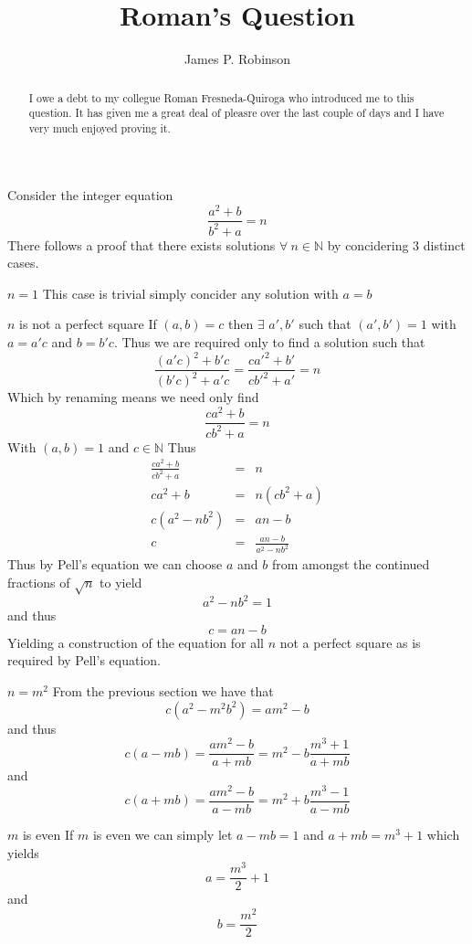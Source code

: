 \documentclass[a4paper,12pt]{article}
\title{Roman's Question}
\author{James P. Robinson}
\begin{document}
\maketitle
\begin{abstract}
\noindent
I owe a debt to my collegue Roman Fresneda-Quiroga who introduced me to this question. It has given me a great deal of pleasre over the last couple of days and I have very much enjoyed proving it.
\end{abstract}
Consider the integer equation $$\frac{a^2+b}{b^2+a}=n$$
There follows a proof that there exists solutions $\forall\ n\in\mathbb{N}$ by concidering 3 distinct cases.
\begin{section}{$n = 1$}
This case is trivial simply concider any solution with $a = b$
\end{section}
\begin{section}{$n$ is not a perfect square}
If $(a,b)=c$ then $\exists$ $a',b'$ such that $(a',b')=1$ with $a=a'c$ and $b=b'c$. Thus we are required only to find a solution such that $$\frac{(a'c)^2 + b'c}{(b'c)^2+a'c} = \frac{ca'^2+b'}{cb'^2+a'} = n$$ 
Which by renaming means we need only find  $$\frac{ca^2+b}{cb^2+a}=n$$ With $(a,b) = 1$ and $c\in\mathbb{N}$
Thus 
\begin{eqnarray*}
  \frac{ca^2+b}{cb^2+a}&=&n\\
  ca^2+b&=&n(cb^2+a)\\
  c(a^2-nb^2)&=&an-b\\
  c&=&\frac{an-b}{a^2-nb^2}
\end{eqnarray*}
Thus by Pell's equation we can choose $a$ and $b$ from amongst the continued fractions of $\sqrt{n}$ to yield $$a^2-nb^2=1$$ and thus $$c=an-b$$ Yielding a construction of the equation for all $n$ not a perfect square as is required by Pell's equation.
\end{section}
\begin{section}{$n=m^2$}
From the previous section we have that $$c(a^2-m^2b^2)=am^2-b$$
and thus $$c(a-mb)=\frac{am^2-b}{a+mb}=m^2-b\frac{m^3+1}{a+mb}$$
and $$c(a+mb)=\frac{am^2-b}{a-mb}=m^2+b\frac{m^3-1}{a-mb}$$
\begin{subsection}{$m$ is even}
  If $m$ is even we can simply let $a-mb=1$ and $a+mb=m^3+1$ which yields
$$a=\frac{m^3}2+1$$ and $$b=\frac{m^2}2$$
\end{subsection}
\end{section}
\end{document}
